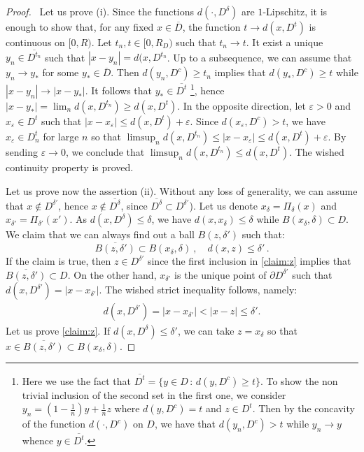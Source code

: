 \documentclass[reqno,11pt]{amsart}
\theoremstyle{definition}
\numberwithin{equation}{section}
\def\e{\varepsilon}
\def\ov{\overline}
\newcommand{\1}{{{\bf 1}\kern-0,28em\rm l}}
\def\proj{\Pi}
\begin{document}
\begin{proof}  \ Let us prove (i). Since the functions $d(\cdot,D^\delta)$ are $1$-Lipschitz, it is enough to show that, for any fixed $x\in \ov D$,
the function  $t \to d(x,D^t)$ is continuous on $[0,R)$. 
Let $t_n, t\in [0,R_D)$ such that $t_n \to t$. It exist a unique $y_n \in \ov {D^{t_n}}$ such that $|x-y_n|= d(x, D^{t_n}$. Up to a subsequence, we can assume that
$y_n \to y_*$ for some $y_*\in \ov D$. Then $d(y_n, D^c)\ge  t_n$ implies that $d(y_*, D^c)\ge t$ while $|x-y_n|\to |x-y_*|$. 
It follows that $y_*\in \ov { D^t}$ \footnote{Here we use the fact that $\ov {D^t}=\{y\in D\, :\, d(y,D^c)\ge t\}$. To show the non trivial inclusion of the second set in the first one, we consider  $y_n=  (1-\frac1{n}) y + \frac1{n} z$ where $d(y,D^c)= t$  and $z\in D^t$. Then by the concavity of the function $d(\cdot,D^c)$ on $D$,
we have that $d(y_n,D^c) >t$  while  $y_n\to y$ whence $y\in \ov { D^t}$. }, hence $|x-y_*|= \lim_n d(x, D^{t_n})  \ge d(x,D^t)$. 
In the opposite direction, let  $\e>0$ and $x_\e \in D^t$ such that $|x-x_\e|\le d(x, D^t)+\e$.  Since $d(x_\e, D^c) >t$, we have $x_\e\in D^t_n$ for large $n$
so that $ \limsup_n d(x, D^{t_n}) \le |x-x_\e|\le  d(x, D^t)+\e$. By sending $\e\to 0$, we conclude that $\limsup_n d(x, D^{t_n})\le d(x,D^t)$.
The wished continuity property is proved.

\medskip 
Let us prove now the assertion (ii). 
Without any loss of generality, we can assume that $x\notin D^{\delta'}$, hence $x\notin \ov{D^\delta}$, since $\ov{D^\delta}\subset D^{\delta'}$). Let us denote
$x_\delta= \proj_\delta(x)$ and   $x_{\delta'}= \proj_{\delta'}(x')$. As $d(x,D^\delta) \le \delta$,  we have  $d(x,x_\delta)\le \delta$ while
$B(x_\delta,\delta)\subset D$. 
We claim that we can always find out a ball $B(z,\delta')$ such that: 
\begin{equation}\label{claim:z}
\ov{B(z,\delta')} \subset B(x_\delta,\delta)\ ,\quad d(x,z) \le \delta'\, . 
\end{equation}
 If the claim is true, then $z\in D^{\delta'}$ since the first inclusion in \eqref{claim:z} implies that $\ov{B(z,\delta')} \subset D$. 
 On the other hand, $x_{\delta'}$ is the unique point of $\partial D^{\delta'}$ such that   $d(x,D^{\delta'})= |x-x_{\delta'}|$. The wished strict inequality
 follows, namely:
 \begin{align*}
d(x,D^{\delta'}) = |x - x_{\delta'}| < |x - z| \le \delta'.
\end{align*}
Let us prove \eqref{claim:z}. If $d(x,D^\delta) \le \delta'$, we can take $z=x_\delta$ so that $x\in \ov{B(z,\delta')}\subset B(x_\delta,\delta)$.


\end{proof}
\end{document}
